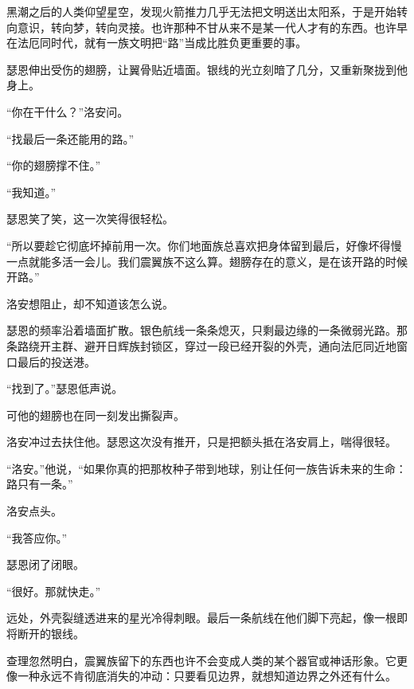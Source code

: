 黑潮之后的人类仰望星空，发现火箭推力几乎无法把文明送出太阳系，于是开始转向意识，转向梦，转向灵接。也许那种不甘从来不是某一代人才有的东西。也许早在法厄同时代，就有一族文明把“路”当成比胜负更重要的事。

瑟恩伸出受伤的翅膀，让翼骨贴近墙面。银线的光立刻暗了几分，又重新聚拢到他身上。

“你在干什么？”洛安问。

“找最后一条还能用的路。”

“你的翅膀撑不住。”

“我知道。”

瑟恩笑了笑，这一次笑得很轻松。

“所以要趁它彻底坏掉前用一次。你们地面族总喜欢把身体留到最后，好像坏得慢一点就能多活一会儿。我们震翼族不这么算。翅膀存在的意义，是在该开路的时候开路。”

洛安想阻止，却不知道该怎么说。

瑟恩的频率沿着墙面扩散。银色航线一条条熄灭，只剩最边缘的一条微弱光路。那条路绕开主群、避开日辉族封锁区，穿过一段已经开裂的外壳，通向法厄同近地窗口最后的投送港。

“找到了。”瑟恩低声说。

可他的翅膀也在同一刻发出撕裂声。

洛安冲过去扶住他。瑟恩这次没有推开，只是把额头抵在洛安肩上，喘得很轻。

“洛安。”他说，“如果你真的把那枚种子带到地球，别让任何一族告诉未来的生命：路只有一条。”

洛安点头。

“我答应你。”

瑟恩闭了闭眼。

“很好。那就快走。”

远处，外壳裂缝透进来的星光冷得刺眼。最后一条航线在他们脚下亮起，像一根即将断开的银线。

查理忽然明白，震翼族留下的东西也许不会变成人类的某个器官或神话形象。它更像一种永远不肯彻底消失的冲动：只要看见边界，就想知道边界之外还有什么。
